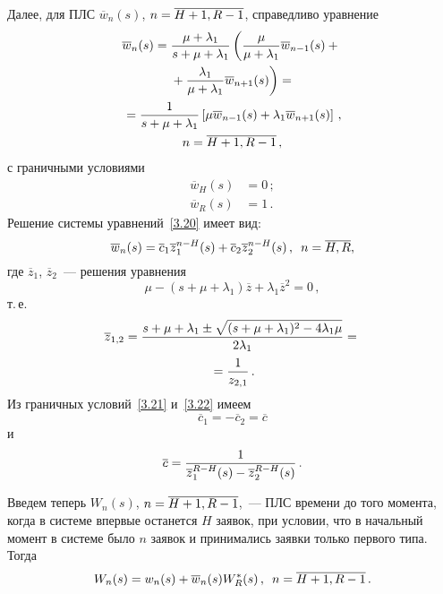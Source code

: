 \begin{multicols}{2}
Далее, для ПЛС $\overline{w}_n(s)$, $n\hm=\overline{H+1,R-1}$,
справедливо уравнение
\begin{multline}
\overline w_{n}(s) = \displaystyle\frac{\displaystyle \mu+\lambda_1 \mathstrut}{\displaystyle s + \mu+\lambda_1\mathstrut}  \left(
\displaystyle\frac{\displaystyle \mu\mathstrut}{\displaystyle \mu+\lambda_1\mathstrut} \overline w_{n-1}(s) +{}\right.\\
\left.{}+
\displaystyle\frac{\displaystyle \lambda_1\mathstrut}{\displaystyle \mu+\lambda_1\mathstrut} \overline w_{n+1}(s)\right)
={}
\\
{}= \displaystyle\frac{\displaystyle 1 \mathstrut}{\displaystyle s + \mu+\lambda_1\mathstrut}
\left[
\mu \overline{w}_{n-1}(s) + \lambda_1 \overline{w}_{n+1}(s)
\right] \,,\\ n=\overline{H+1,R-1}\,,
\label{3.20}
\end{multline}
с граничными условиями
\begin{align}
\label{3.21}
\overline{w}_{H}(s)&= 0 \,;
\\
\label{3.22}
\overline {w}_{R}(s)& = 1 \,.
\end{align}
Решение системы уравнений~\eqref{3.20} имеет вид:
\begin{equation*}
\overline{w}_{n}(s) = \overline{c}_1 \overline{z}_1^{n-H}(s) + \overline{c}_2 \overline{z}_2^{n-H}(s)\,,\enskip 
n=\overline{H,R},
\end{equation*}
где $\overline{z}_1$, $\overline{z}_2$~--- решения уравнения
\begin{equation*}
\mu - (s + \mu + \lambda_1) \overline{z} + \lambda_1 \overline{z}^2 = 0 \,,
\end{equation*}
т.\,е.
\begin{multline}
\label{3.25}
\overline z_{1,2}=\displaystyle\frac{\displaystyle  s+\mu+\lambda_1 \pm \sqrt {(s+\mu+\lambda_1)^2 - 4 \lambda_1 \mu}
\mathstrut}{\displaystyle 2 \lambda_1 \mathstrut} ={}\\
{}= \displaystyle\frac{\displaystyle 1\mathstrut}{\displaystyle  z_{2,1}\mathstrut}\,.
\end{multline}
Из граничных условий~\eqref{3.21} и~\eqref{3.22} имеем
\begin{equation*}
\overline{c}_1 = -\overline{c}_2 = \overline{c}
\end{equation*}
и
\begin{equation*}
\overline{c} = \displaystyle\frac{\displaystyle  1 \mathstrut}{\displaystyle  \overline{z}_1^{R-H}(s) - \overline{z}_2^{R-H}(s)\mathstrut}\,.
\end{equation*}

Введем теперь $W_n(s)$, $n\hm=\overline{H+1,R-1}$,~--- ПЛС времени
до того момента, когда в системе впервые останется $H$ заявок, при
условии, что в начальный момент в системе было $n$ заявок и
принимались заявки только первого типа. Тогда
\begin{equation*}
W_{n}(s) = w_{n}(s) + \overline w_{n}(s) W^*_R(s) \,,\enskip n=\overline{H+1,R-1}\,.
\end{equation*}


\end{multicols}
